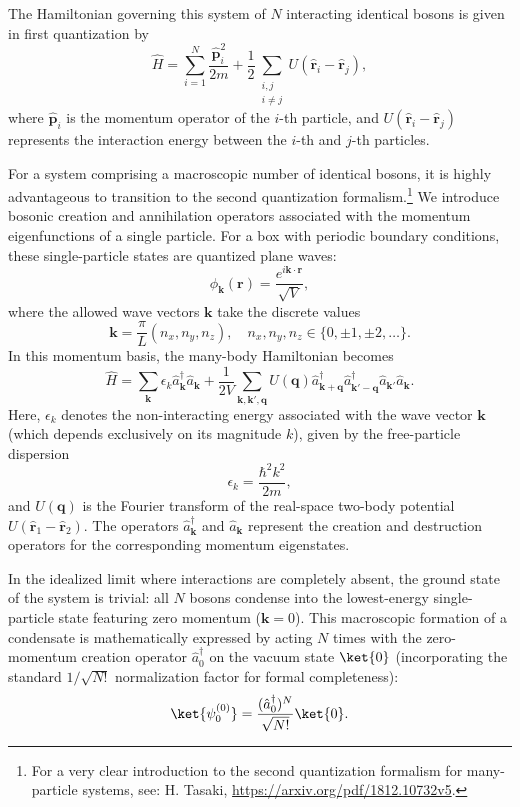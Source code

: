 The Hamiltonian governing this system of \( N \) interacting identical bosons is given in first quantization by
\[
    \hat{H} = \sum_{i=1}^N \frac{\hat{\mathbf{p}}_i^2}{2m} + \frac{1}{2} \sum_{\substack{i,j \\ i \neq j}} U(\hat{\mathbf{r}}_i - \hat{\mathbf{r}}_j),
\]
where \( \hat{\mathbf{p}}_i \) is the momentum operator of the \( i \)-th particle, and \( U(\hat{\mathbf{r}}_i - \hat{\mathbf{r}}_j) \) represents the interaction energy between the \( i \)-th and \( j \)-th particles.

For a system comprising a macroscopic number of identical bosons, it is highly advantageous to transition to the second quantization formalism.\footnote{For a very clear introduction to the second quantization formalism for many-particle systems, see: H. Tasaki, \url{https://arxiv.org/pdf/1812.10732v5}.} We introduce bosonic creation and annihilation operators associated with the momentum eigenfunctions of a single particle. For a box with periodic boundary conditions, these single-particle states are quantized plane waves:
\[
    \phi_{\mathbf{k}}(\mathbf{r}) = \frac{e^{i \mathbf{k} \cdot \mathbf{r}}}{\sqrt{V}},
\]
where the allowed wave vectors \( \mathbf{k} \) take the discrete values
\[
    \mathbf{k} = \frac{\pi}{L} (n_x, n_y, n_z), \quad n_x, n_y, n_z \in \{0, \pm 1, \pm 2, \dots \}.
\]
In this momentum basis, the many-body Hamiltonian becomes
\begin{equation} \label{eq:ham_second_quant}
    \hat{H} = \sum_{\mathbf{k}} \epsilon_k \hat{a}^\dagger_{\mathbf{k}} \hat{a}_{\mathbf{k}} + \frac{1}{2V} \sum_{\mathbf{k}, \mathbf{k}', \mathbf{q}} U(\mathbf{q}) \hat{a}^\dagger_{\mathbf{k}+\mathbf{q}} \hat{a}^\dagger_{\mathbf{k}'-\mathbf{q}} \hat{a}_{\mathbf{k}'} \hat{a}_{\mathbf{k}}.
\end{equation}
Here, \( \epsilon_k \) denotes the non-interacting energy associated with the wave vector \( \mathbf{k} \) (which depends exclusively on its magnitude \( k \)), given by the free-particle dispersion
\[
    \epsilon_k = \frac{\hbar^2 k^2}{2m},
\]
and \( U(\mathbf{q}) \) is the Fourier transform of the real-space two-body potential \( U(\hat{\mathbf{r}}_1 - \hat{\mathbf{r}}_2) \). The operators \( \hat{a}_{\mathbf{k}}^\dagger \) and \( \hat{a}_{\mathbf{k}} \) represent the creation and destruction operators for the corresponding momentum eigenstates.

In the idealized limit where interactions are completely absent, the ground state of the system is trivial: all \( N \) bosons condense into the lowest-energy single-particle state featuring zero momentum (\( \mathbf{k} = 0 \)). This macroscopic formation of a condensate is mathematically expressed by acting \( N \) times with the zero-momentum creation operator \( \hat{a}_0^\dagger \) on the vacuum state \( \ket{0} \) (incorporating the standard \( 1/\sqrt{N!} \) normalization factor for formal completeness):
\begin{equation} \label{eq:ideal_bec}
    \ket{\psi_0^{(0)}} = \frac{(\hat{a}_0^\dagger)^N}{\sqrt{N!}}  \ket{0}.
\end{equation}


